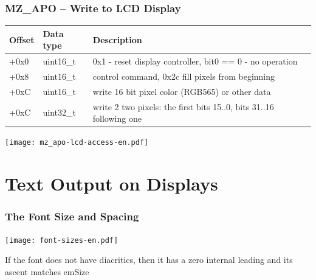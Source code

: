 \documentclass{beamer}
\begin{document}
\begin{frame}
\frametitle{MZ\_APO -- Write to LCD Display}

\begin{tabular}{|l|l|l|l|} \hline
Offset & \footnotesize{Data type} & Description \\\hline
+0x0 & \footnotesize{uint16\_t} & \footnotesize{0x1 - reset display controller, bit0 == 0 - no operation} \\\hline
+0x8 & \footnotesize{uint16\_t} & \footnotesize{control command, 0x2c fill pixels from beginning} \\\hline
+0xC & \footnotesize{uint16\_t} & \footnotesize{write 16 bit pixel color (RGB565) or other data} \\\hline
+0xC & \footnotesize{uint32\_t} & \footnotesize{write 2 two pixels: the first bits 15..0, bits 31..16 following one} \\\hline
\end{tabular}

\vspace{5mm}

\texttt{[image: mz\_apo-lcd-access-en.pdf]}

\end{frame}

\section{Text Output on Displays}


\begin{frame}
\frametitle{The Font Size and Spacing}

\texttt{[image: font-sizes-en.pdf]}

If the font does not have diacritics, then it has a zero internal leading and its ascent matches emSize

\end{frame}
\end{document}
